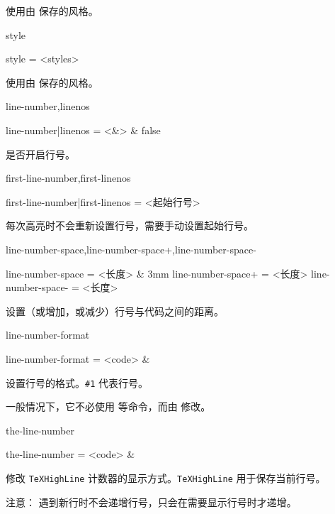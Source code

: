 \documentclass[class=article,openany]{cusdoc}
\begin{document}
\begin{function}{\THUseSavedStyle}
  \begin{syntax}
    \V\THUseSavedStyle {}
  \end{syntax}
使用由  保存的风格。
\end{function}

\begin{keyval}[path=high]{style}
  \begin{syntax}
    style = <styles>
  \end{syntax}
使用由  保存的风格。
\end{keyval}

\begin{keyval}[path=high]{line-number,linenos}
  \begin{syntax}
    line-number|linenos = <&\TTF> & false
  \end{syntax}
是否开启行号。
\end{keyval}

\begin{keyval}[path=high]{first-line-number,first-linenos}
  \begin{syntax}
    first-line-number|first-linenos = <起始行号>
  \end{syntax}
 每次高亮时不会重新设置行号，需要手动设置起始行号。
\end{keyval}

\begin{keyval}[path=high]{line-number-space,line-number-space+,line-number-space-}
  \begin{syntax}
    line-number-space  = <长度> & 3mm
    line-number-space+ = <长度>
    line-number-space- = <长度>
  \end{syntax}
设置（或增加，或减少）行号与代码之间的距离。
\end{keyval}

\begin{keyval}[path=high]{line-number-format}
  \begin{syntax}
    line-number-format = <code> & 
  \end{syntax}
设置行号的格式。\verb|#1| 代表行号。

一般情况下，它不必使用  等命令，而由  修改。
\end{keyval}

\begin{keyval}[path=high]{the-line-number}
  \begin{syntax}
    the-line-number = <code> & 
  \end{syntax}
修改 \texttt{TeXHighLine} 计数器的显示方式。\texttt{TeXHighLine} 用于保存当前行号。

注意： 遇到新行时不会递增行号，只会在需要显示行号时才递增。
\end{keyval}
\end{document}
